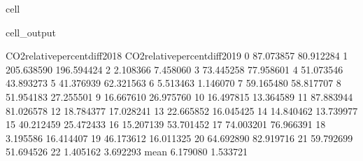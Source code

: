 \documentclass[letterpaper,10pt,english]{jupyterBook}
\begin{document}
\begin{sphinxuseclass}{cell}
\begin{sphinxVerbatimOutput}
\begin{sphinxuseclass}{cell_output}
\begin{sphinxVerbatim}[commandchars=\\\{\}]
     CO2\PYGZus{}relative\PYGZus{}percent\PYGZus{}diff\PYGZus{}2018  CO2\PYGZus{}relative\PYGZus{}percent\PYGZus{}diff\PYGZus{}2019  \PYGZbs{}
0                        \PYGZhy{}87.073857                      \PYGZhy{}80.912284   
1                       \PYGZhy{}205.638590                     \PYGZhy{}196.594424   
2                         \PYGZhy{}2.108366                       \PYGZhy{}7.458060   
3                         73.445258                       77.958601   
4                         51.073546                       43.893273   
5                        \PYGZhy{}41.376939                      \PYGZhy{}62.321563   
6                          5.513463                        1.146070   
7                         59.165480                       58.817707   
8                         51.954183                       27.255501   
9                        \PYGZhy{}16.667610                      \PYGZhy{}26.975760   
10                        16.497815                       13.364589   
11                        87.883944                       81.026578   
12                        18.784377                       17.028241   
13                       \PYGZhy{}22.665852                      \PYGZhy{}16.045425   
14                        14.840462                       13.739977   
15                        40.212459                       25.472433   
16                       \PYGZhy{}15.207139                      \PYGZhy{}53.701452   
17                        74.003201                       76.966391   
18                        \PYGZhy{}3.195586                      \PYGZhy{}16.414407   
19                        46.173612                       16.011325   
20                       \PYGZhy{}64.692890                      \PYGZhy{}82.919716   
21                        59.792699                       51.694526   
22                         1.405162                        3.692293   
mean                       6.179080                       \PYGZhy{}1.533721   


\end{sphinxVerbatim}
\end{sphinxuseclass}
\end{sphinxVerbatimOutput}
\end{sphinxuseclass}
\end{document}
